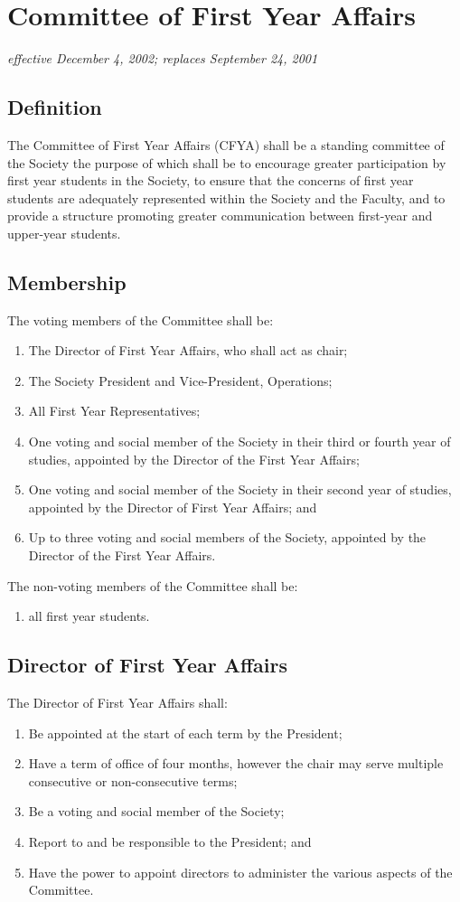 \section{Committee of First Year Affairs}
\emph{effective December 4, 2002; replaces September 24, 2001}

\subsection{Definition}
The Committee of First Year Affairs (CFYA) shall be a standing committee of the Society the purpose of which shall be to encourage greater participation by first year students in the Society, to ensure that the concerns of first year students are adequately represented within the Society and the Faculty, and to provide a structure promoting greater communication between first-year and upper-year students.

\subsection{Membership}
The voting members of the Committee shall be:
\begin{enumerate}
\item The Director of First Year Affairs, who shall act as chair;
\item The Society President and Vice-President, Operations;
\item All First Year Representatives;
\item One voting and social member of the Society in their third or fourth year of studies, appointed by the Director of the First Year Affairs;
\item One voting and social member of the Society in their second year of studies, appointed by the Director of First Year Affairs; and
\item Up to three voting and social members of the Society, appointed by the Director of the First Year Affairs.
\end{enumerate}
The non-voting members of the Committee shall be:
\begin{enumerate}
\item all first year students.
\end{enumerate}

\subsection{Director of First Year Affairs}
The Director of First Year Affairs shall:
\begin{enumerate}
\item Be appointed at the start of each term by the President;
\item Have a term of office of four months, however the chair may serve multiple consecutive or non-consecutive terms;
\item Be a voting and social member of the Society;
\item Report to and be responsible to the President; and
\item Have the power to appoint directors to administer the various aspects of the Committee.
\end{enumerate}
